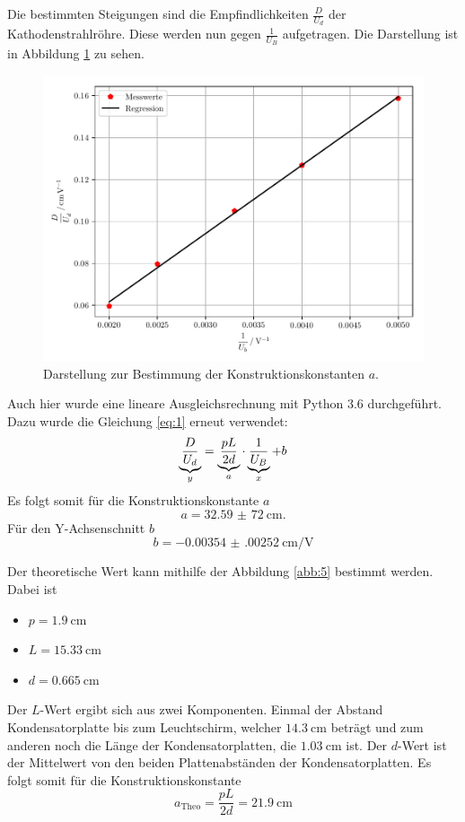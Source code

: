 Die bestimmten Steigungen sind die Empfindlichkeiten $\frac{D}{U_d}$ der Kathodenstrahlröhre.
Diese werden nun gegen $\frac{1}{U_B}$ aufgetragen.
Die Darstellung ist in Abbildung \ref{abb:11} zu sehen.
\begin{figure}[H]
  \centering
  \includegraphics[width=\textwidth]{plot6.pdf}
  \caption{Darstellung zur Bestimmung der Konstruktionskonstanten $a$.}
  \label{abb:11}
\end{figure}
Auch hier wurde eine lineare Ausgleichsrechnung mit Python 3.6 durchgeführt.
Dazu wurde die Gleichung \ref{eq:1} erneut verwendet:
\begin{equation*}
  \underbrace{\frac{D}{U_d}}_{\mathclap{y}} = \underbrace{\frac{pL}{2d}}_{\mathclap{a}} \cdot \underbrace{\frac{1}{U_B}}_{\mathclap{x}} + b
\end{equation*}
Es folgt somit für die Konstruktionskonstante $a$
\begin{equation*}
  a = \SI{32,59(72)}{\centi\meter}.
\end{equation*}
Für den Y-Achsenschnitt $b$
\begin{equation*}
  b = \SI{-0.00354(00252)}{\centi\meter\per\volt}
\end{equation*}

Der theoretische Wert kann mithilfe der Abbildung \ref{abb:5} bestimmt werden.
Dabei ist
\begin{itemize}
  \item $p = \SI{1.9}{\centi\meter}$
  \item $L = \SI{15.33}{\centi\meter}$
  \item $d = \SI{0.665}{\centi\meter}$
\end{itemize}
Der $L$-Wert ergibt sich aus zwei Komponenten. Einmal der Abstand Kondensatorplatte bis
zum Leuchtschirm, welcher $\SI{14.3}{\centi\meter}$ beträgt und zum anderen noch die Länge
der Kondensatorplatten, die $\SI{1.03}{\centi\meter}$ ist.
Der $d$-Wert ist der Mittelwert von den beiden Plattenabständen der Kondensatorplatten.
Es folgt somit für die Konstruktionskonstante
\begin{equation*}
  a_{\text{Theo}} = \frac{pL}{2d} = \SI{21.9}{\centi\meter}
\end{equation*}

